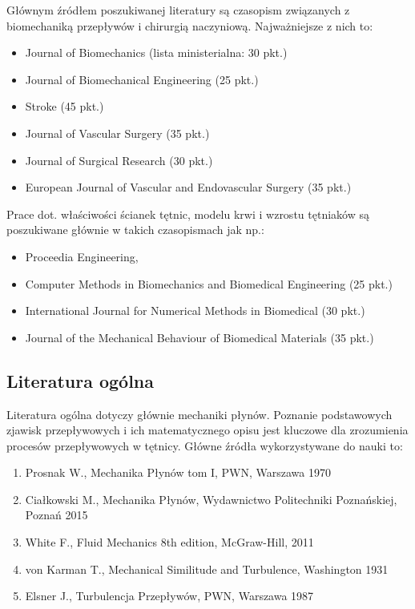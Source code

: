 \documentclass[11pt]{article} %
\begin{document}
Głównym źródłem poszukiwanej literatury są czasopism związanych z biomechaniką przepływów i chirurgią naczyniową. Najważniejsze z nich to: 
\begin{itemize} 
\item Journal of Biomechanics (lista ministerialna: 30 pkt.)
\item Journal of Biomechanical Engineering (25 pkt.)
\item Stroke (45 pkt.)
\item Journal of Vascular Surgery (35 pkt.)
\item Journal of Surgical Research (30 pkt.)
\item European Journal of Vascular and Endovascular Surgery (35 pkt.) 
\end{itemize}
Prace dot. właściwości ścianek tętnic, modelu krwi i wzrostu tętniaków są poszukiwane głównie w takich czasopismach jak np.:
\begin{itemize} 
\item Proceedia Engineering, 
\item Computer Methods in Biomechanics and Biomedical Engineering (25 pkt.) 
\item International Journal for Numerical Methods in Biomedical (30 pkt.)
\item Journal of the Mechanical Behaviour of Biomedical Materials (35 pkt.) 
\end{itemize}


\subsection{Literatura ogólna} %

Literatura ogólna dotyczy głównie mechaniki płynów. Poznanie podstawowych zjawisk przepływowych i ich matematycznego opisu jest kluczowe dla zrozumienia procesów przepływowych w tętnicy. Główne źródła wykorzystywane do nauki to:

\begin{enumerate} 
\item Prosnak W., Mechanika Płynów tom I, PWN, Warszawa 1970
\item Ciałkowski M., Mechanika Płynów, Wydawnictwo Politechniki Poznańskiej, Poznań 2015
\item White F., Fluid Mechanics 8th edition, McGraw-Hill, 2011 
\item von Karman T., Mechanical Similitude and Turbulence, Washington 1931
\item Elsner J., Turbulencja Przepływów, PWN, Warszawa 1987
\end{enumerate}
\end{document}
